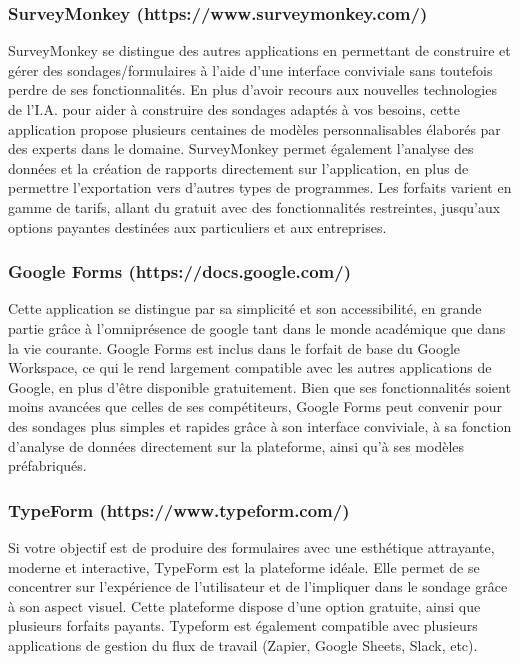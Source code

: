 \documentclass[
  letterpaper,
]{scrbook}
\begin{document}
\hypertarget{surveymonkey-httpswww.surveymonkey.com}{%
\subsubsection{SurveyMonkey
(https://www.surveymonkey.com/)}\label{surveymonkey-httpswww.surveymonkey.com}}

\hfill\break
SurveyMonkey se distingue des autres applications en permettant de
construire et gérer des sondages/formulaires à l'aide d'une interface
conviviale sans toutefois perdre de ses fonctionnalités. En plus d'avoir
recours aux nouvelles technologies de l'I.A. pour aider à construire des
sondages adaptés à vos besoins, cette application propose plusieurs
centaines de modèles personnalisables élaborés par des experts dans le
domaine. SurveyMonkey permet également l'analyse des données et la
création de rapports directement sur l'application, en plus de permettre
l'exportation vers d'autres types de programmes. Les forfaits varient en
gamme de tarifs, allant du gratuit avec des fonctionnalités restreintes,
jusqu'aux options payantes destinées aux particuliers et aux
entreprises.

\hypertarget{google-forms-httpsdocs.google.com}{%
\subsubsection{Google Forms
(https://docs.google.com/)}\label{google-forms-httpsdocs.google.com}}

\hfill\break
Cette application se distingue par sa simplicité et son accessibilité,
en grande partie grâce à l'omniprésence de google tant dans le monde
académique que dans la vie courante. Google Forms est inclus dans le
forfait de base du Google Workspace, ce qui le rend largement compatible
avec les autres applications de Google, en plus d'être disponible
gratuitement. Bien que ses fonctionnalités soient moins avancées que
celles de ses compétiteurs, Google Forms peut convenir pour des sondages
plus simples et rapides grâce à son interface conviviale, à sa fonction
d'analyse de données directement sur la plateforme, ainsi qu'à ses
modèles préfabriqués.

\hypertarget{typeform-httpswww.typeform.com}{%
\subsubsection{TypeForm
(https://www.typeform.com/)}\label{typeform-httpswww.typeform.com}}

\hfill\break
Si votre objectif est de produire des formulaires avec une esthétique
attrayante, moderne et interactive, TypeForm est la plateforme idéale.
Elle permet de se concentrer sur l'expérience de l'utilisateur et de
l'impliquer dans le sondage grâce à son aspect visuel. Cette plateforme
dispose d'une option gratuite, ainsi que plusieurs forfaits payants.
Typeform est également compatible avec plusieurs applications de gestion
du flux de travail (Zapier, Google Sheets, Slack, etc).
\end{document}
